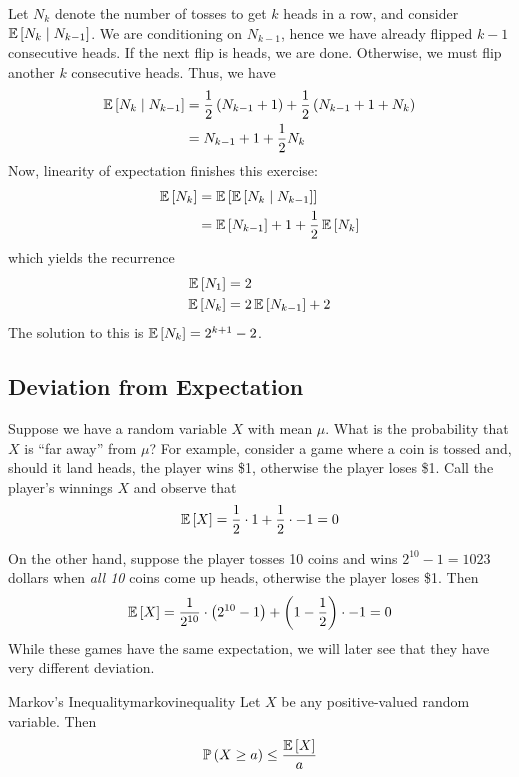 Let $N_k$ denote the number of tosses to get $k$ heads in a row, and consider
$\operatorname{\mathbb{E}}\left[N_k \mid N_{k - 1}\right]$. We are conditioning on $N_{k - 1}$, hence
we have already flipped $k - 1$ consecutive heads. If the next flip is heads, we
are done. Otherwise, we must flip another $k$ consecutive heads. Thus, we have
\begin{align*}\operatorname{\mathbb{E}}\left[N_k \mid N_{k - 1}\right]
    &= \frac{1}{2}\left(N_{k - 1} + 1\right) + \frac{1}{2}\left(N_{k - 1} + 1 + N_k\right)\\
    &= N_{k - 1} + 1 + \frac{1}{2}N_k
\end{align*}
Now, linearity of expectation finishes this exercise:
\begin{align*}\operatorname{\mathbb{E}}\left[N_k\right]
    &= \operatorname{\mathbb{E}}\left[\operatorname{\mathbb{E}}\left[N_k \mid N_{k - 1}\right]\right]\\
    &= \operatorname{\mathbb{E}}\left[N_{k - 1}\right] + 1 + \frac{1}{2}\operatorname{\mathbb{E}}\left[N_k\right]
\end{align*}
which yields the recurrence
\begin{align*}
    \operatorname{\mathbb{E}}\left[N_1\right] &= 2\\
    \operatorname{\mathbb{E}}\left[N_k\right] &= 2\operatorname{\mathbb{E}}\left[N_{k - 1}\right] + 2
\end{align*}
The solution to this is $\operatorname{\mathbb{E}}\left[N_k\right] = 2^{k + 1} - 2$.

\subsection{Deviation from Expectation}
Suppose we have a random variable $X$ with mean $\mu$. What is the probability
that $X$ is ``far away'' from $\mu$? For example, consider a game where a coin
is tossed and, should it land heads, the player wins \$1, otherwise the player
loses \$1. Call the player's winnings $X$ and observe that
\[\operatorname{\mathbb{E}}\left[X\right] = \frac{1}{2}\cdot 1 + \frac{1}{2} \cdot -1 = 0\]

On the other hand, suppose the player tosses 10 coins and wins $2^{10} - 1 =
1023$ dollars when \emph{all 10} coins come up heads, otherwise the player loses
\$1. Then
\[\operatorname{\mathbb{E}}\left[X\right] = \frac{1}{2^{10}}\cdot \left(2^{10} - 1\right) + \left(1 - \frac{1}{2}\right) \cdot -1 = 0\]
While these games have the same expectation, we will later see that they have
very different deviation.

\begin{theorem}{Markov's Inequality}{markovinequality}
    Let $X$ be any positive-valued random variable. Then
    \[\operatorname{\mathbb{P}}\left(X \geq a\right) \leq \frac{\operatorname{\mathbb{E}}\left[X\right]}{a}\]
\end{theorem}

